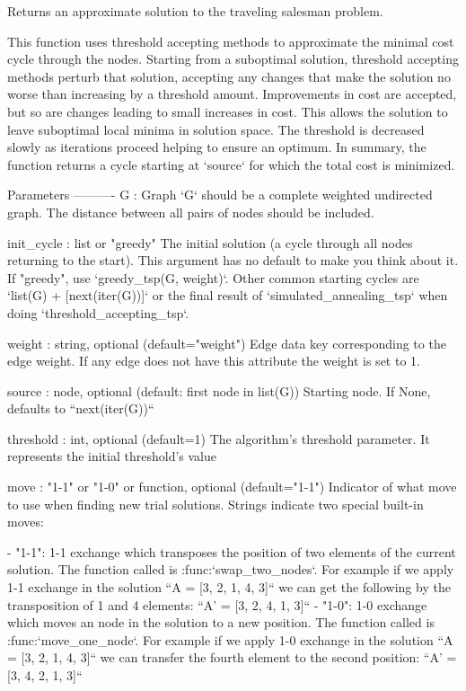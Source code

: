 \begin{DoxyVerb}Returns an approximate solution to the traveling salesman problem.

This function uses threshold accepting methods to approximate the minimal cost
cycle through the nodes. Starting from a suboptimal solution, threshold
accepting methods perturb that solution, accepting any changes that make
the solution no worse than increasing by a threshold amount. Improvements
in cost are accepted, but so are changes leading to small increases in cost.
This allows the solution to leave suboptimal local minima in solution space.
The threshold is decreased slowly as iterations proceed helping to ensure
an optimum. In summary, the function returns a cycle starting at `source`
for which the total cost is minimized.

Parameters
----------
G : Graph
    `G` should be a complete weighted undirected graph.
    The distance between all pairs of nodes should be included.

init_cycle : list or "greedy"
    The initial solution (a cycle through all nodes returning to the start).
    This argument has no default to make you think about it.
    If "greedy", use `greedy_tsp(G, weight)`.
    Other common starting cycles are `list(G) + [next(iter(G))]` or the final
    result of `simulated_annealing_tsp` when doing `threshold_accepting_tsp`.

weight : string, optional (default="weight")
    Edge data key corresponding to the edge weight.
    If any edge does not have this attribute the weight is set to 1.

source : node, optional (default: first node in list(G))
    Starting node.  If None, defaults to ``next(iter(G))``

threshold : int, optional (default=1)
    The algorithm's threshold parameter. It represents the initial
    threshold's value

move : "1-1" or "1-0" or function, optional (default="1-1")
    Indicator of what move to use when finding new trial solutions.
    Strings indicate two special built-in moves:

    - "1-1": 1-1 exchange which transposes the position
      of two elements of the current solution.
      The function called is :func:`swap_two_nodes`.
      For example if we apply 1-1 exchange in the solution
      ``A = [3, 2, 1, 4, 3]``
      we can get the following by the transposition of 1 and 4 elements:
      ``A' = [3, 2, 4, 1, 3]``
    - "1-0": 1-0 exchange which moves an node in the solution
      to a new position.
      The function called is :func:`move_one_node`.
      For example if we apply 1-0 exchange in the solution
      ``A = [3, 2, 1, 4, 3]``
      we can transfer the fourth element to the second position:
      ``A' = [3, 4, 2, 1, 3]``


\end{DoxyVerb}
